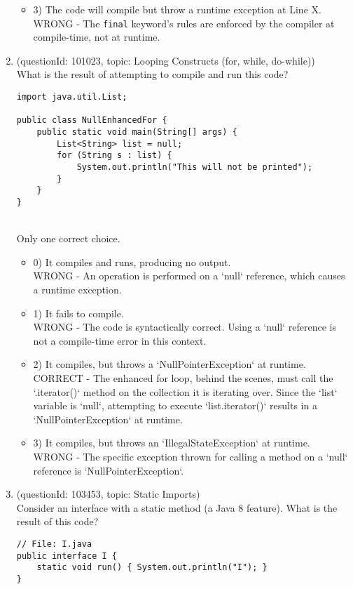 \documentclass[12pt]{article}
\begin{document}
\begin{enumerate}[label=(\arabic*)]
\begin{itemize}
\item 3) The code will compile but throw a runtime exception at Line X.
 \\ 
WRONG - The \verb|final| keyword's rules are enforced by the compiler at compile-time, not at runtime.

\end{itemize}
\item (questionId: 101023, topic: Looping Constructs (for, while, do-while)) \\ 
What is the result of attempting to compile and run this code?\n\begin{verbatim}
import java.util.List;

public class NullEnhancedFor {
    public static void main(String[] args) {
        List<String> list = null;
        for (String s : list) {
            System.out.println("This will not be printed");
        }
    }
}
\end{verbatim}
\\ \noindent Only one correct choice. 
\begin{itemize}
\item 0) It compiles and runs, producing no output.
 \\ 
WRONG - An operation is performed on a `null` reference, which causes a runtime exception.

\item 1) It fails to compile.
 \\ 
WRONG - The code is syntactically correct. Using a `null` reference is not a compile-time error in this context.

\item 2) It compiles, but throws a `NullPointerException` at runtime.
 \\ 
CORRECT - The enhanced for loop, behind the scenes, must call the `.iterator()` method on the collection it is iterating over. Since the `list` variable is `null`, attempting to execute `list.iterator()` results in a `NullPointerException` at runtime.

\item 3) It compiles, but throws an `IllegalStateException` at runtime.
 \\ 
WRONG - The specific exception thrown for calling a method on a `null` reference is `NullPointerException`.

\end{itemize}
\item (questionId: 103453, topic: Static Imports) \\ 
Consider an interface with a static method (a Java 8 feature). What is the result of this code?
\begin{verbatim}
// File: I.java
public interface I {
    static void run() { System.out.println("I"); }
}


\end{verbatim}
\end{enumerate}
\end{document}

